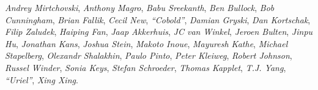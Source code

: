 \emph{Andrey Mirtchovski},
\emph{Anthony Magro},
\emph{Babu Sreekanth},
\emph{Ben Bullock},
\emph{Bob Cunningham},
\emph{Brian Fallik},
\emph{Cecil New},
\emph{``Cobold''},
\emph{Damian Gryski},
\emph{Dan Kortschak},
\emph{Filip Zaludek},
\emph{Haiping Fan},
\emph{Jaap Akkerhuis},
\emph{JC van Winkel},
\emph{Jeroen Bulten},
\emph{Jinpu Hu},
\emph{Jonathan Kans},
\emph{Joshua Stein},
\emph{Makoto Inoue},
\emph{Mayuresh Kathe},
\emph{Michael Stapelberg},
\emph{Olexandr Shalakhin},
\emph{Paulo Pinto},
\emph{Peter Kleiweg},
\emph{Robert Johnson},
\emph{Russel Winder},
\emph{Sonia Keys},
\emph{Stefan Schroeder},
\emph{Thomas Kapplet},
\emph{T.J. Yang},
\emph{``Uriel''},
\emph{Xing Xing}.
